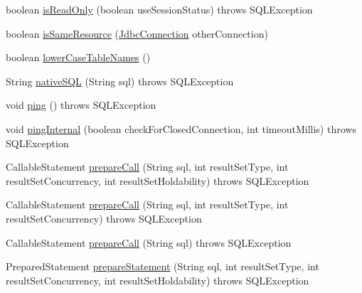 \begin{DoxyCompactItemize}
boolean \mbox{\hyperlink{classcom_1_1mysql_1_1cj_1_1jdbc_1_1ha_1_1_multi_host_my_s_q_l_connection_a8d98f787c6394382daeda85369d080ee}{is\+Read\+Only}} (boolean use\+Session\+Status)  throws S\+Q\+L\+Exception 
\item 
boolean \mbox{\hyperlink{classcom_1_1mysql_1_1cj_1_1jdbc_1_1ha_1_1_multi_host_my_s_q_l_connection_a47d81e605bf65122771ecb727b6177ed}{is\+Same\+Resource}} (\mbox{\hyperlink{interfacecom_1_1mysql_1_1cj_1_1jdbc_1_1_jdbc_connection}{Jdbc\+Connection}} other\+Connection)
\item 
boolean \mbox{\hyperlink{classcom_1_1mysql_1_1cj_1_1jdbc_1_1ha_1_1_multi_host_my_s_q_l_connection_a5a3250cfcbd628ed09ce0eb494a1ff20}{lower\+Case\+Table\+Names}} ()
\item 
String \mbox{\hyperlink{classcom_1_1mysql_1_1cj_1_1jdbc_1_1ha_1_1_multi_host_my_s_q_l_connection_a29b987e63be332899cde99fd0843e806}{native\+S\+QL}} (String sql)  throws S\+Q\+L\+Exception 
\item 
void \mbox{\hyperlink{classcom_1_1mysql_1_1cj_1_1jdbc_1_1ha_1_1_multi_host_my_s_q_l_connection_a75f3a66c04a2960e920a6e57a3279556}{ping}} ()  throws S\+Q\+L\+Exception 
\item 
void \mbox{\hyperlink{classcom_1_1mysql_1_1cj_1_1jdbc_1_1ha_1_1_multi_host_my_s_q_l_connection_a491d262b3c772b5b3f9763a82119afed}{ping\+Internal}} (boolean check\+For\+Closed\+Connection, int timeout\+Millis)  throws S\+Q\+L\+Exception 
\item 
Callable\+Statement \mbox{\hyperlink{classcom_1_1mysql_1_1cj_1_1jdbc_1_1ha_1_1_multi_host_my_s_q_l_connection_adc6996979c6328df33a21c05ce3a6636}{prepare\+Call}} (String sql, int result\+Set\+Type, int result\+Set\+Concurrency, int result\+Set\+Holdability)  throws S\+Q\+L\+Exception 
\item 
Callable\+Statement \mbox{\hyperlink{classcom_1_1mysql_1_1cj_1_1jdbc_1_1ha_1_1_multi_host_my_s_q_l_connection_a5333a6b37a33a1c124cb80fd9d498052}{prepare\+Call}} (String sql, int result\+Set\+Type, int result\+Set\+Concurrency)  throws S\+Q\+L\+Exception 
\item 
Callable\+Statement \mbox{\hyperlink{classcom_1_1mysql_1_1cj_1_1jdbc_1_1ha_1_1_multi_host_my_s_q_l_connection_acc31ece42a098ce7d2c7f9caabb12be0}{prepare\+Call}} (String sql)  throws S\+Q\+L\+Exception 
\item 
Prepared\+Statement \mbox{\hyperlink{classcom_1_1mysql_1_1cj_1_1jdbc_1_1ha_1_1_multi_host_my_s_q_l_connection_ac89505b40f72ef452508c241a4197906}{prepare\+Statement}} (String sql, int result\+Set\+Type, int result\+Set\+Concurrency, int result\+Set\+Holdability)  throws S\+Q\+L\+Exception 

\end{DoxyCompactItemize}
